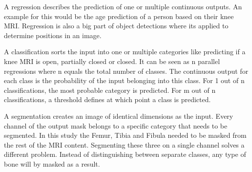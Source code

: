 A regression describes the prediction of one or multiple continuous outputs. An example for this would be the age prediction of a person based on their knee MRI. Regression is also a big part of object detections where its applied to determine positions in an image.

A classification sorts the input into one or multiple categories like predicting if a knee MRI is open, partially closed or closed. It can be seen as n parallel regressions where n equals the total number of classes. The continuous output for each class is the probability of the input belonging into this class. For 1 out of n classifications, the most probable category is predicted. For m out of n classifications, a threshold defines at which point a class is predicted.

A segmentation creates an image of identical dimensions as the input. Every channel of the output mask belongs to a specific category that needs to be segmented. In this study the Femur, Tibia and Fibula needed to be masked from the rest of the MRI content. Segmenting these three on a single channel solves a different problem. Instead of distinguishing between separate classes, any type of bone will by masked as a result.

\newpage